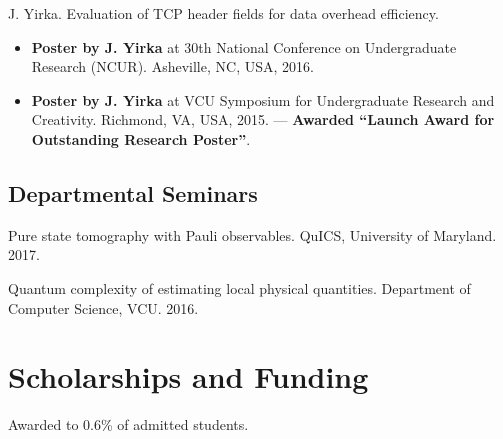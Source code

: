 \documentclass[11pt,letterpaper,serif]{moderncv}
\newcommand{\pubItemSep}{0.3em}
\begin{document}
J. Yirka. Evaluation of TCP header fields for data overhead efficiency.
\begin{adjustwidth}{.25in}{}
	\begin{itemize}[itemsep=\pubItemSep]
		\item \textbf{Poster by J. Yirka} at 30th National Conference on Undergraduate Research (NCUR). Asheville, NC, USA, 2016.
		\item \textbf{Poster by J. Yirka} at VCU Symposium for Undergraduate Research and Creativity. Richmond, VA, USA, 2015. --- \textbf{Awarded ``Launch Award for Outstanding Research Poster''}.
	\end{itemize}
\end{adjustwidth}


\subsection{Departmental Seminars}
{ \leftskip 0.2in \parindent -0.2in %

Pure state tomography with Pauli observables. QuICS, University of Maryland. 2017.

Quantum complexity of estimating local physical quantities. Department of Computer Science, VCU. 2016.

}


\section{Scholarships and Funding \hspace{2em}{\footnotesize (all dollar amounts in USD)}}
{
	\begin{adjustwidth}{.25in}{}
		Awarded to 0.6\% of admitted students.
	\end{adjustwidth}
}

\vspace{4\parskip}

\end{document}
